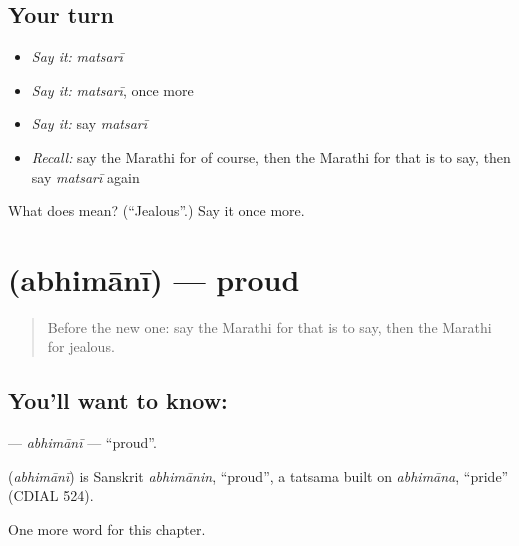 \subsection*{Your turn}
\begin{itemize}
\raggedright
  \item \emph{Say it:} \emph{matsarī}
  \item \emph{Say it:} \emph{matsarī}, once more
  \item \emph{Say it:} say \emph{matsarī}
  \item \emph{Recall:} say the Marathi for of course, then the Marathi for that is to say, then say \emph{matsarī} again
\end{itemize}

\begin{tcolorbox}[breakable,colback=teal!4,colframe=teal!35!black,title={Before you move on}]
What does  mean? (\textquotedblleft{}Jealous\textquotedblright{}.) Say it once more.
\end{tcolorbox}
\section[\texorpdfstring{\mr{अभिमानी} (abhimānī)}{अभिमानी (abhimānī)}]{ (abhimānī) — proud}

\label{lesson:MR-C232-abhimani}



\begin{quote}
Before the new one: say the Marathi for that is to say, then the Marathi for jealous.
\end{quote}

\subsection*{You'll want to know: }
\textbf{} — \emph{abhimānī} — \textquotedblleft{}proud\textquotedblright{}.

\begin{cousinweb}
\textbf{} (\emph{abhimānī}) is Sanskrit \emph{abhimānin}, \textquotedblleft{}proud\textquotedblright{}, a tatsama built on \emph{abhimāna}, \textquotedblleft{}pride\textquotedblright{} (CDIAL 524).
\end{cousinweb}

\begin{grammarlens}[title={What you've built}]
One more word for this chapter.
\end{grammarlens}

